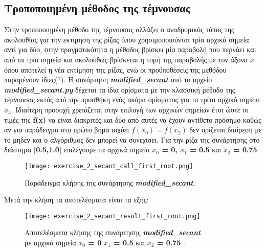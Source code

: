 \documentclass[First Project.tex]{subfiles}
\begin{document}
\subsection{ Τροποποιημένη μέθοδος της τέμνουσας }

Στην τροποποιημένη μέθοδο της τέμνουσας αλλάζει ο αναδρομικός τύπος της ακολουθίας για την εκτίμηση της ρίζας όπου χρησιμοποιούνται τρία
αρχικά σημεία αντί για δύο,  στην πραγματικότητα η μέθοδος βρίσκει μία παραβολή που περνάει και από τα τρία σημεία και ακολούθως βρίσκεται η 
τομή της παραβολής με τον άξονα $x$ όπου αποτελεί η νέα εκτίμηση της ρίζας, ενώ οι προϋποθέσεις της μεθόδου παραμένουν ίδιες(?). Η συνάρτηση 
\textit{\textlatin{\textbf{modified\_secant}}} από το αρχείο \textit{\textlatin{\textbf{modified\_secant.py}}} δέχεται τα ίδια ορίσματα με 
την κλασσική μέθοδο της τέμνουσας εκτός από την προσθήκη ενός ακόμα ορίσματος για το τρίτο αρχικό σημέιο \textlatin{\textbf{$x_{3}$}}. Ιδιαίτερη
προσοχή χρειάζεται στην επιλογή των αρχικών σημείων έτσι ώστε οι τιμές της \textlatin{\textbf{f(x)}} να είναι διακριτές και δύο από αυτές να 
έχουν αντίθετο πρόσημο καθώς αν για παράδειγμα στο πρώτο βήμα ισχύει \textbf{$f(x_{0}) = f(x_{2})$} δεν ορίζεται διαίρεση με το μηδέν και ο 
αλγόριθμος δεν μπορεί να συνεχίσει. Για την ρίζα της συνάρτησης στο διάστημα \textbf{[0.5,1.0]} επιλέγουμε τα αρχικά σημεία 
\textbf{$x_{0}$ = 0, $x_{1}$ = 0.5} και \textbf{$x_{2}$ = 0.75}.
\vspace{5px}
\begin{figure}[h!]
    \centering
    \captionsetup{justification=centering}
    \begin{center}
        \texttt{[image: exercise\_2\_secant\_call\_first\_root.png]}    
        \caption{ Παράδειγμα κλήσης της συνάρτησης \textit{\textlatin{\textbf{modified\_secant}}.}} 
    \end{center}
\end{figure}


Μετά την κλήση τα αποτελέσματα είναι τα εξής:
\vspace{5px}
\begin{figure}[h!]
    \centering
    \captionsetup{justification=centering}
    \begin{center}
    \texttt{[image: exercise\_2\_secant\_result\_first\_root.png]}    
    \caption{ Αποτελέσματα κλήσης της συνάρτησης \textit{\textlatin{\textbf{modified\_secant}}} \\ με αρχικά σημεία \textbf{\textlatin{$x_{0}$ = 0}} 
                \textbf{\textlatin{$x_{1}$ = 0.5}} και \textbf{\textlatin{$x_{2}$ = 0.75}} . }
    \end{center}
\end{figure}
\end{document}
